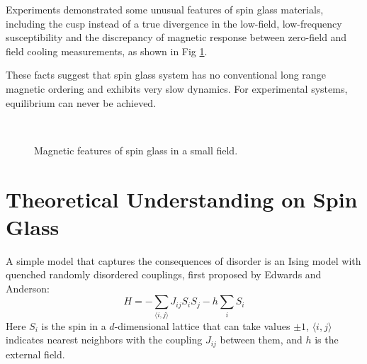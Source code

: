 Experiments demonstrated some unusual features of spin glass materials, 
including the cusp instead of a true divergence in the low-field, low-frequency 
susceptibility and the discrepancy of magnetic response between zero-field and field cooling 
measurements, as shown in Fig \ref{fig:experimentsSG}. 

These facts suggest that spin glass system has no conventional 
long range magnetic ordering and exhibits very slow dynamics. For experimental systems, 
equilibrium can  never be achieved. 

\begin{figure}[!h]
  \label{fig:experimentsSG}
  \centering
  \\  
  \caption{Magnetic features of spin glass in a small field.}
\end{figure}

\section{Theoretical Understanding on Spin Glass}
A simple model that captures the consequences of disorder is an Ising model 
with quenched randomly disordered couplings, first proposed by Edwards and 
Anderson:
\begin{equation}
  \label{eq:Edwards-Anderson}
  H=-\sum_{\langle i,j \rangle}J_{ij}S_iS_j-h\sum_iS_i
\end{equation}
Here $S_i$ is the spin in a $d$-dimensional lattice that can take values $\pm 1$,
$\langle i,j \rangle$ indicates nearest neighbors with the coupling $J_{ij}$ between 
them, and $h$ is the external field.
 
